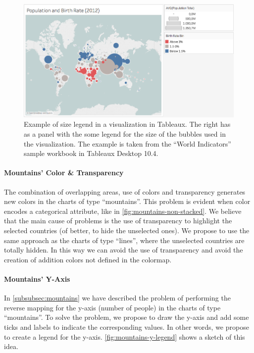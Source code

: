 \begin{figure}[h]
	\centering
	\includegraphics[width=0.95\columnwidth]{figures/size-legend}
	\caption{Example of size legend in a visualization in Tableaux. The right has as a panel with the some legend for the size of the bubbles used in the visualization. The example is taken from the ``World Indicators'' sample workbook in Tableaux Desktop 10.4.}
	\label{fig:size-legend}
\end{figure}

\paragraph{Mountains' Color \& Transparency}
The combination of overlapping areas, use of colors and transparency generates new colors in the charts of type ``mountains''.
This problem is evident when color encodes a categorical attribute, like in \cref{fig:mountains-non-stacked}.
We believe that the main cause of problems is the use of transparency to highlight the selected countries (of better, to hide the unselected ones).
We propose to use the same approach as the charts of type ``lines'', where the unselected countries are totally hidden.
In this way we can avoid the use of transparency and avoid the creation of addition colors not defined in the colormap.

\paragraph{Mountains' Y-Axis}
In \cref{subsubsec:mountains} we have described the problem of performing the reverse mapping for the y-axis (number of people) in the charts of type ``mountains''.
To solve the problem, we propose to draw the y-axis and add some ticks and labels to indicate the corresponding values.
In other words, we propose to create a legend for the y-axis.
\cref{fig:mountains-y-legend} shows a sketch of this idea.

